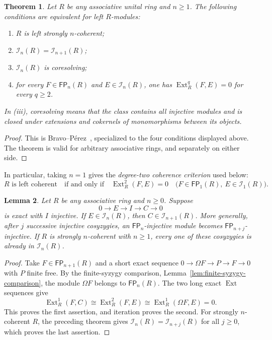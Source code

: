 \documentclass[11pt]{article}
\numberwithin{equation}{section}
\newtheorem{theorem}{Theorem}[section]
\newtheorem{lemma}[theorem]{Lemma}
\theoremstyle{definition}
\theoremstyle{remark}
\newcommand{\Ext}{\operatorname{Ext}}
\newcommand{\FP}{\mathsf{FP}}
\begin{document}
\begin{theorem}
\label{sc:thm:FPn-inj-criteria}
Let $R$ be any associative unital ring and $n\ge1$.  The following
conditions are equivalent for left $R$-modules:
\begin{enumerate}[label=(\roman*)]
\item $R$ is left strongly $n$-coherent;
\item $\mathcal I_n(R)=\mathcal I_{n+1}(R)$;
\item $\mathcal I_n(R)$ is coresolving;
\item for every $F\in\FP_n(R)$ and $E\in\mathcal I_n(R)$,
      one has $\Ext_R^q(F,E)=0$ for every $q\ge2$.
\end{enumerate}
In (iii), \emph{coresolving} means that the class contains all
injective modules and is closed under extensions and cokernels of
monomorphisms between its objects.
\end{theorem}
\begin{proof}
This is Bravo--P\'erez~\cite[Theorem~5.5]{BravoPerez},
specialized to the four conditions displayed above.  The theorem
is valid for arbitrary associative rings, and separately on either
side.
\end{proof}

In particular, taking $n=1$ gives the \emph{degree-two coherence
criterion} used below:
\begin{equation}\label{sc:eq:FPinj-coherence-test}
R\text{ is left coherent}
\quad\text{if and only if}\quad
\Ext_R^2(F,E)=0
\quad\bigl(F\in\FP_1(R),\ E\in\mathcal I_1(R)\bigr).
\end{equation}

\begin{lemma}\label{sc:lem:cosyzygy-staircase}
Let $R$ be any associative ring and $n\ge0$.  Suppose
\[
0\longrightarrow E\longrightarrow I\longrightarrow C
\longrightarrow0
\]
is exact with $I$ injective.  If $E\in\mathcal I_n(R)$, then
$C\in\mathcal I_{n+1}(R)$.  More generally, after $j$ successive
injective cosyzygies, an $\FP_n$-injective module becomes
$\FP_{n+j}$-injective.  If $R$ is strongly $n$-coherent with
$n\ge1$, every one of these cosyzygies is already in
$\mathcal I_n(R)$.
\end{lemma}
\begin{proof}
Take $F\in\FP_{n+1}(R)$ and a short exact sequence
$0\to\Omega F\to P\to F\to0$ with $P$ finite free.
By the finite-syzygy comparison,
Lemma~\ref{lem:finite-syzygy-comparison}, the module $\Omega F$
belongs to $\FP_n(R)$.  The two long exact $\Ext$ sequences give
\[
\Ext_R^1(F,C)\cong\Ext_R^2(F,E)
\cong\Ext_R^1(\Omega F,E)=0.
\]
This proves the first assertion, and iteration proves the second.
For strongly $n$-coherent $R$, the preceding theorem gives
$\mathcal I_n(R)=\mathcal I_{n+j}(R)$ for all $j\ge0$,
which proves the last assertion.
\end{proof}
\end{document}
